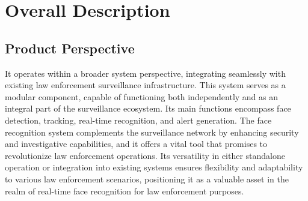 \documentclass{scrreprt}
\begin{document}
\chapter{Overall Description}
    \section{Product Perspective}
        It operates within a broader system perspective, integrating seamlessly with existing law enforcement surveillance infrastructure. This system serves as a modular component, capable of functioning both independently and as an integral part of the surveillance ecosystem. Its main functions encompass face detection, tracking, real-time recognition, and alert generation. The face recognition system complements the surveillance network by enhancing security and investigative capabilities, and it offers a vital tool that promises to revolutionize law enforcement operations. Its versatility in either standalone operation or integration into existing systems ensures flexibility and adaptability to various law enforcement scenarios, positioning it as a valuable asset in the realm of real-time face recognition for law enforcement purposes.
    
\end{document}
